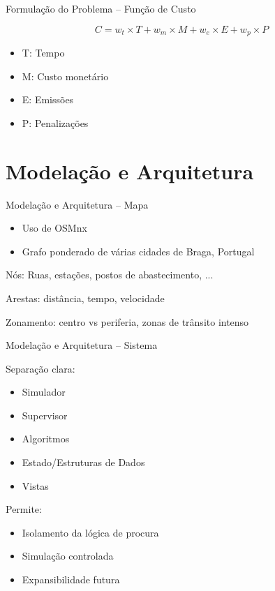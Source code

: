 \documentclass[13pt, handout]{beamer}
\begin{document}
\begin{frame}{Formulação do Problema -- Função de Custo}

    \[
        C = w_t \times T + w_m \times M + w_e \times E + w_p \times P
    \]

    \begin{itemize}
        \item T: Tempo
        \item M: Custo monetário
        \item E: Emissões
        \item P: Penalizações
    \end{itemize}
\end{frame}

\section{Modelação e Arquitetura}

\begin{frame}{Modelação e Arquitetura -- Mapa}

    \begin{itemize}
        \item Uso de OSMnx
        \item Grafo ponderado de várias cidades de Braga, Portugal
    \end{itemize}
    \vspace{0.5cm}

    Nós: Ruas, estações, postos de abastecimento, ...
    \vspace{0.5cm}
    
    Arestas: distância, tempo, velocidade
    \vspace{0.5cm}
    
    Zonamento: centro vs periferia, zonas de trânsito intenso
    
\end{frame}

\begin{frame}{Modelação e Arquitetura -- Sistema}

    Separação clara:
    \begin{itemize}
        \item Simulador
        \item Supervisor
        \item Algoritmos
        \item Estado/Estruturas de Dados
        \item Vistas
    \end{itemize}

    \vspace{0.5cm}

    Permite:
    \begin{itemize}
        \item Isolamento da lógica de procura
        \item Simulação controlada
        \item Expansibilidade futura
    \end{itemize}
    
\end{frame}
\end{document}
